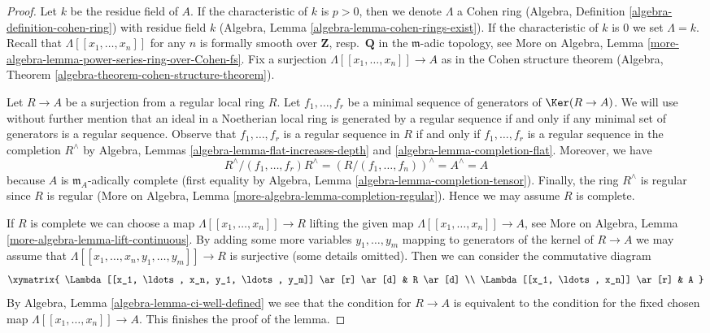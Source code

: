 \begin{proof}
Let $k$ be the residue field of $A$. If the characteristic of
$k$ is $p > 0$, then we denote $\Lambda$ a Cohen ring
(Algebra, Definition \ref{algebra-definition-cohen-ring})
with residue field $k$ (Algebra, Lemma \ref{algebra-lemma-cohen-rings-exist}).
If the characteristic of $k$ is $0$ we set $\Lambda = k$.
Recall that $\Lambda[[x_1, \ldots, x_n]]$ for any $n$
is formally smooth over $\mathbf{Z}$, resp.\ $\mathbf{Q}$
in the $\mathfrak m$-adic topology, see
More on Algebra, Lemma
\ref{more-algebra-lemma-power-series-ring-over-Cohen-fs}.
Fix a surjection $\Lambda[[x_1, \ldots, x_n]] \to A$ as in
the Cohen structure theorem
(Algebra, Theorem \ref{algebra-theorem-cohen-structure-theorem}).

\medskip\noindent
Let $R \to A$ be a surjection from a regular local ring $R$.
Let $f_1, \ldots, f_r$ be a minimal sequence of generators
of $\Ker(R \to A)$. We will use without further mention
that an ideal in a Noetherian local ring is generated by a regular
sequence if and only if any minimal set of generators is a
regular sequence. Observe that $f_1, \ldots, f_r$
is a regular sequence in $R$ if and only if $f_1, \ldots, f_r$
is a regular sequence in the completion $R^\wedge$ by
Algebra, Lemmas \ref{algebra-lemma-flat-increases-depth} and
\ref{algebra-lemma-completion-flat}.
Moreover, we have
$$
R^\wedge/(f_1, \ldots, f_r)R^\wedge =
(R/(f_1, \ldots, f_n))^\wedge = A^\wedge = A
$$
because $A$ is $\mathfrak m_A$-adically complete (first equality by
Algebra, Lemma \ref{algebra-lemma-completion-tensor}). Finally,
the ring $R^\wedge$ is regular since $R$ is regular
(More on Algebra, Lemma \ref{more-algebra-lemma-completion-regular}).
Hence we may assume $R$ is complete.

\medskip\noindent
If $R$ is complete we can choose a map
$\Lambda[[x_1, \ldots, x_n]] \to R$ lifting the given map
$\Lambda[[x_1, \ldots, x_n]] \to A$, see
More on Algebra, Lemma \ref{more-algebra-lemma-lift-continuous}.
By adding some more variables $y_1, \ldots, y_m$ mapping
to generators of the kernel of $R \to A$ we may assume that
$\Lambda[[x_1, \ldots, x_n, y_1, \ldots, y_m]] \to R$ is surjective
(some details omitted). Then we can consider the commutative diagram
$$
\xymatrix{
\Lambda[[x_1, \ldots, x_n, y_1, \ldots, y_m]] \ar[r] \ar[d] & R \ar[d] \\
\Lambda[[x_1, \ldots, x_n]] \ar[r] & A
}
$$
By Algebra, Lemma \ref{algebra-lemma-ci-well-defined} we see that
the condition for $R \to A$ is equivalent to the condition for
the fixed chosen map
$\Lambda[[x_1, \ldots, x_n]] \to A$. This finishes the proof of the lemma.
\end{proof}


